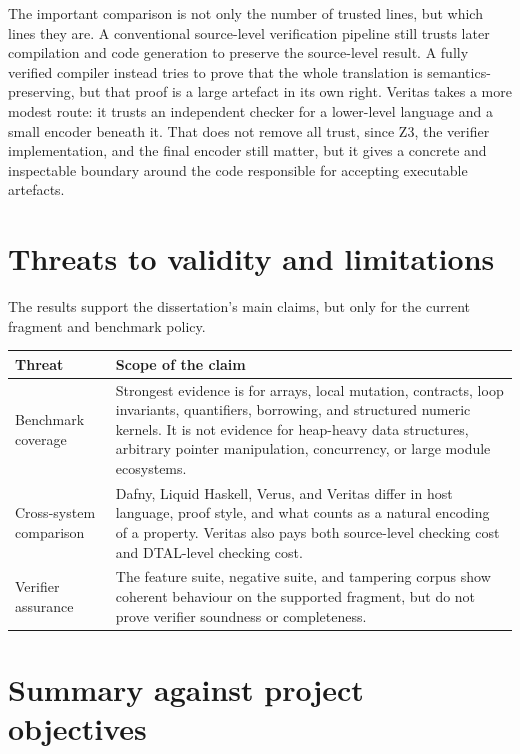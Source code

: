 The important comparison is not only the number of trusted lines, but which lines they are. A conventional source-level verification pipeline still trusts later compilation and code generation to preserve the source-level result. A fully verified compiler instead tries to prove that the whole translation is semantics-preserving, but that proof is a large artefact in its own right. Veritas takes a more modest route: it trusts an independent checker for a lower-level language and a small encoder beneath it. That does not remove all trust, since Z3, the verifier implementation, and the final encoder still matter, but it gives a concrete and inspectable boundary around the code responsible for accepting executable artefacts.

\section{Threats to validity and limitations}

The results support the dissertation's main claims, but only for the current fragment and benchmark policy.

\begin{center}
\small
\begin{tabularx}{0.96\textwidth}{>{\raggedright\arraybackslash}p{} >{\raggedright\arraybackslash}X}
\toprule
\textbf{Threat} & \textbf{Scope of the claim} \\
\midrule
Benchmark coverage & Strongest evidence is for arrays, local mutation, contracts, loop invariants, quantifiers, borrowing, and structured numeric kernels. It is not evidence for heap-heavy data structures, arbitrary pointer manipulation, concurrency, or large module ecosystems. \\
Cross-system comparison & Dafny, Liquid Haskell, Verus, and Veritas differ in host language, proof style, and what counts as a natural encoding of a property. Veritas also pays both source-level checking cost and DTAL-level checking cost. \\
Verifier assurance & The feature suite, negative suite, and tampering corpus show coherent behaviour on the supported fragment, but do not prove verifier soundness or completeness. \\
\bottomrule
\end{tabularx}
\end{center}

\section{Summary against project objectives}

